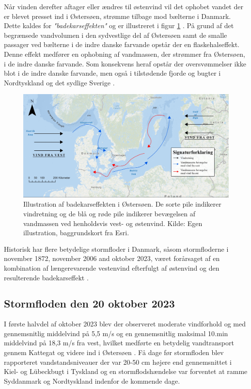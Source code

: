Når vinden derefter aftager eller ændres til østenvind vil det ophobet vandet der er blevet presset ind i Østersøen, strømme tilbage mod bælterne i Danmark. Dette kaldes for \textit{"badekarseffekten"} og er illustreret i figur \ref{Figur: Bathtub effect} \citep{kystdirektoratet_stormfloder, egusphere_baltic}. På grund af det begrænsede vandvolumen i den sydvestlige del af Østersøen samt de smalle passager ved bælterne i de indre danske farvande opstår der en flaskehalseffekt. Denne effekt medfører en ophobning af vandmassen, der strømmer fra Østersøen, i de indre danske farvande. Som konsekvens heraf opstår der oversvømmelser ikke blot i de indre danske farvande, men også i tilstødende fjorde og bugter i Nordtyskland og det sydlige Sverige \citep{egusphere_baltic, kiesel_brief_2024}.
\begin{figure}[H]
    \centering
    \includegraphics[width=0.8\linewidth]{images/teori/bathtub effect graphics.jpg}
    \caption{Illustration af badekarseffekten i Østersøen. De sorte pile indikerer vindretning og de blå og røde pile indikerer bevægelsen af vandmassen ved henholdsvis vest- og østenvind. Kilde: Egen illustration, baggrundskort fra Esri.}
    \label{Figur: Bathtub effect}
\end{figure}

Historisk har flere betydelige stormfloder i Danmark, såsom stormfloderne i november 1872, november 2006 and oktober 2023, været forårsaget af en kombination af længerevarende vestenvind efterfulgt af østenvind og den resulterende badekarseffekt \citep{kystdirektoratet_stormfloder}.

\subsection{Stormfloden den 20 oktober 2023} \label{Afsnit: Stormfloden den 20 oktober 2023}
I første halvdel af oktober 2023 blev der observeret moderate vindforhold og med gennemsnitlig middelvind på 5,5 m/s og en gennemsnitlig maksimal 10.min middelvind på 18,3 m/s fra vest, hvilket medførte en betydelig vandtransport gennem Kattegat og videre ind i Østersøen \citep{dmi_vejrarkiv}. Få dage før stormfloden blev rapporteret vandstandsniveauer der var 20-50 cm højere end gennemsnittet i Kiel- og Lübeckbugt i Tyskland \citep{kiesel_brief_2024} og en stormflodshændelse var forventet at ramme Syddanmark og Nordtyskland indenfor de kommende dage.\\

